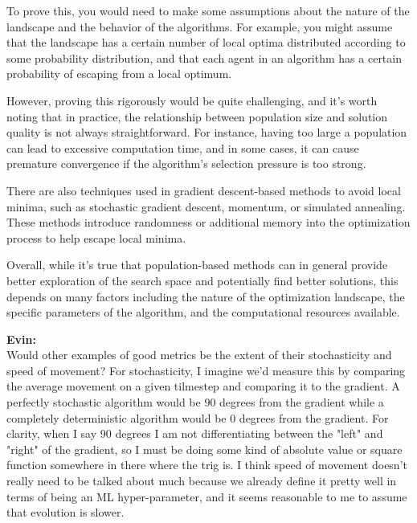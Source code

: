 \documentclass{article}[10pt]
\begin{document}
To prove this, you would need to make some assumptions about the nature of the landscape and the behavior of the algorithms. 
For example, you might assume that the landscape has a certain number of local optima distributed according to some probability distribution, and that each agent in an algorithm has a certain probability of escaping from a local optimum.\par

However, proving this rigorously would be quite challenging, and it's worth noting that in practice, the relationship between population size and solution quality is not always straightforward. 
For instance, having too large a population can lead to excessive computation time, and in some cases, it can cause premature convergence if the algorithm's selection pressure is too strong. \par

There are also techniques used in gradient descent-based methods to avoid local minima, such as stochastic gradient descent, momentum, or simulated annealing. 
These methods introduce randomness or additional memory into the optimization process to help escape local minima.\par

Overall, while it's true that population-based methods can in general provide better exploration of the search space and potentially find better solutions, this depends on many factors including the nature of the optimization landscape, the specific parameters of the algorithm, and the computational resources available.\par


\noindent \textbf{Evin:}\\
Would other examples of good metrics be the extent of their stochasticity and speed of movement? 
For stochasticity, I imagine we'd measure this by comparing the average movement on a given tilmestep and comparing it to the gradient. 
A perfectly stochastic algorithm would be 90 degrees from the gradient while a completely deterministic algorithm would be 0 degrees from the gradient. 
For clarity, when I say 90 degrees I am not differentiating between the "left" and "right" of the gradient, so I must be doing some kind of absolute value or square function somewhere in there where the trig is. 
I think speed of movement doesn't really need to be talked about much because we already define it pretty well in terms of being an ML hyper-parameter, and it seems reasonable to me to assume that evolution is slower.\par
\end{document}
